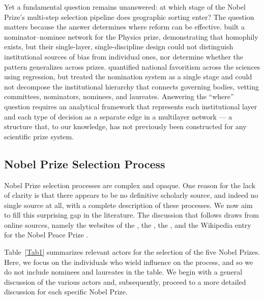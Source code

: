 \documentclass[11pt]{article}
\begin{document}
Yet a fundamental question remains unanswered: at which stage of the Nobel Prize's multi-step selection pipeline does geographic sorting enter? The question matters because the answer determines where reform can be effective. \citet{GalDom2019} built a nominator--nominee network for the Physics prize, demonstrating that homophily exists, but their single-layer, single-discipline design could not distinguish institutional sources of bias from individual ones, nor determine whether the pattern generalizes across prizes. \citet{KoJanYan2024} quantified national favoritism across the sciences using regression, but treated the nomination system as a single stage and could not decompose the institutional hierarchy that connects governing bodies, vetting committees, nominators, nominees, and laureates. Answering the ``where'' question requires an analytical framework that represents each institutional layer and each type of decision as a separate edge in a multilayer network --- a structure that, to our knowledge, has not previously been constructed for any scientific prize system.

\subsection{Nobel Prize Selection Process}

Nobel Prize selection processes are complex and opaque. One reason for the lack of clarity is that there appears to be no definitive scholarly source, and indeed no single source at all, with a complete description of these processes. We now aim to fill this surprising gap in the literature. The discussion that follows draws from online sources, namely the websites of the \citet{NobelPrizeWebsiteFull}, the \citet{RSAS}, the \citet{KINA}, and the Wikipedia entry for the Nobel Peace Prize \citep{NPPWiki}.

Table~\ref{Tab1} summarizes relevant actors for the selection of the five Nobel Prizes. Here, we focus on the individuals who wield influence on the process, and so we do not include nominees and laureates in the table. We begin with a general discussion of the various actors and, subsequently, proceed to a more detailed discussion for each specific Nobel Prize.
\end{document}
